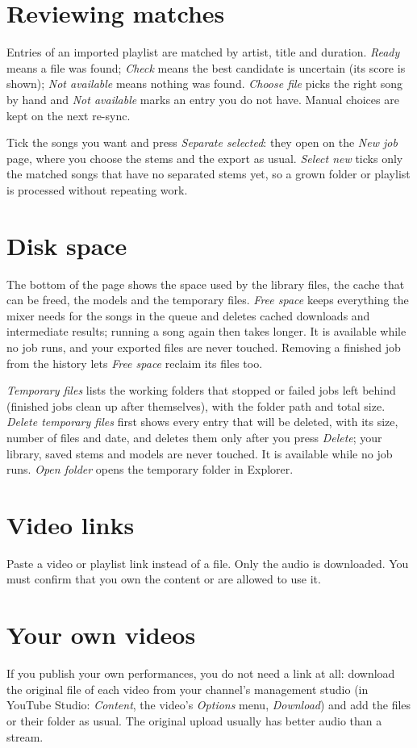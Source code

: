 \documentclass{covermaker}
\begin{document}
\section{Reviewing matches}
Entries of an imported playlist are matched by artist, title and duration.
\emph{Ready} means a file was found; \emph{Check} means the best candidate is
uncertain (its score is shown); \emph{Not available} means nothing was found.
\emph{Choose file} picks the right song by hand and \emph{Not available} marks
an entry you do not have. Manual choices are kept on the next re-sync.

Tick the songs you want and press \emph{Separate selected}: they open on the
\emph{New job} page, where you choose the stems and the export as usual.
\emph{Select new} ticks only the matched songs that have no separated stems
yet, so a grown folder or playlist is processed without repeating work.

\section{Disk space}
The bottom of the page shows the space used by the library files, the cache
that can be freed, the models and the temporary files. \emph{Free space} keeps
everything the mixer needs for the songs in the queue and deletes cached
downloads and intermediate results; running a song again then takes longer.
It is available while no job runs, and your exported files are never touched.
Removing a finished job from the history lets \emph{Free space} reclaim its
files too.

\emph{Temporary files} lists the working folders that stopped or failed jobs
left behind (finished jobs clean up after themselves), with the folder path
and total size. \emph{Delete temporary files} first shows every entry that
will be deleted, with its size, number of files and date, and deletes them
only after you press \emph{Delete}; your library, saved stems and models are
never touched. It is available while no job runs. \emph{Open folder} opens the
temporary folder in Explorer.

\section{Video links}
Paste a video or playlist link instead of a file. Only the audio is downloaded.
You must confirm that you own the content or are allowed to use it.

\section{Your own videos}
If you publish your own performances, you do not need a link at all: download
the original file of each video from your channel's management studio (in
YouTube Studio: \emph{Content}, the video's \emph{Options} menu,
\emph{Download}) and add the files or their folder as usual. The original
upload usually has better audio than a stream.
\end{document}
